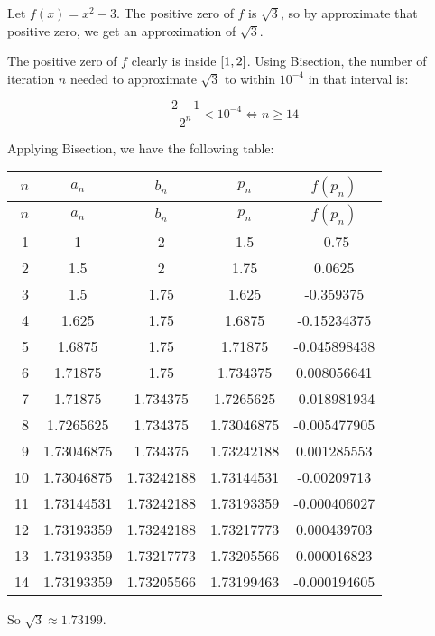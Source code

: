 \documentclass[../../Assignments.tex]{subfiles}
\begin{document}
\begin{solution}
    Let \(f(x) = x^2 - 3\). The positive zero of \(f\) is \(\sqrt{3}\), so by
    approximate that positive zero, we get an approximation of \(\sqrt{3}\).

    The positive zero of \(f\) clearly is inside \(\interval{1}{2}\). Using
    Bisection, the number of iteration \(n\) needed to approximate \(\sqrt{3}\)
    to within \(10^{-4}\) in that interval is:

    \[\frac{2 - 1}{2^n} < 10^{-4} \iff n \geq 14\]

    Applying Bisection, we have the following table:

    \begin{longtable}{r S[table-format=1.8] S[table-format=1.8] S[table-format=1.8] S[table-format=-1.9]}
        \toprule
        \(n\)  &   {\(a_n\)}   &   {\(b_n\)}   &   {\(p_n\)}   &  {\(f(p_n)\)}  \\
        \midrule
        \endfirsthead
        \toprule
        \(n\)  &   {\(a_n\)}   &   {\(b_n\)}   &   {\(p_n\)}   &  {\(f(p_n)\)}  \\
        \midrule
          &  1            &  2            &  1.5          &  -0.75         \\
            2  &  1.5          &  2            &  1.75         &   0.0625       \\
            3  &  1.5          &  1.75         &  1.625        &  -0.359375     \\
            4  &  1.625        &  1.75         &  1.6875       &  -0.15234375   \\
            5  &  1.6875       &  1.75         &  1.71875      &  -0.045898438  \\
            6  &  1.71875      &  1.75         &  1.734375     &   0.008056641  \\
            7  &  1.71875      &  1.734375     &  1.7265625    &  -0.018981934  \\
            8  &  1.7265625    &  1.734375     &  1.73046875   &  -0.005477905  \\
            9  &  1.73046875   &  1.734375     &  1.73242188   &   0.001285553  \\
           10  &  1.73046875   &  1.73242188   &  1.73144531   &  -0.00209713   \\
           11  &  1.73144531   &  1.73242188   &  1.73193359   &  -0.000406027  \\
           12  &  1.73193359   &  1.73242188   &  1.73217773   &   0.000439703  \\
           13  &  1.73193359   &  1.73217773   &  1.73205566   &   0.000016823  \\
           14  &  1.73193359   &  1.73205566   &  1.73199463   &  -0.000194605  \\
       \bottomrule
    \end{longtable}

    So \(\sqrt{3} \approx \num{1.73199}\).
\end{solution}
\end{document}
